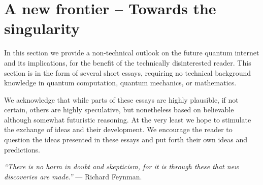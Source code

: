 %
%

\section{A new frontier -- Towards the singularity} \label{sec:outlook}  

In this section we provide a non-technical outlook on the future quantum internet and its implications, for the benefit of the technically disinterested reader. This section is in the form of several short essays, requiring no technical background knowledge in quantum computation, quantum mechanics, or mathematics.

We acknowledge that while parts of these essays are highly plausible, if not certain, others are highly speculative, but nonetheless based on believable although somewhat futuristic reasoning. At the very least we hope to stimulate the exchange of ideas and their development. We encourage the reader to question the ideas presented in these essays and put forth their own ideas and predictions.

\textit{``There is no harm in doubt and skepticism, for it is through these that new discoveries are made.''} --- Richard Feynman.

%
%




%
%




%
%




%
%




%
%




